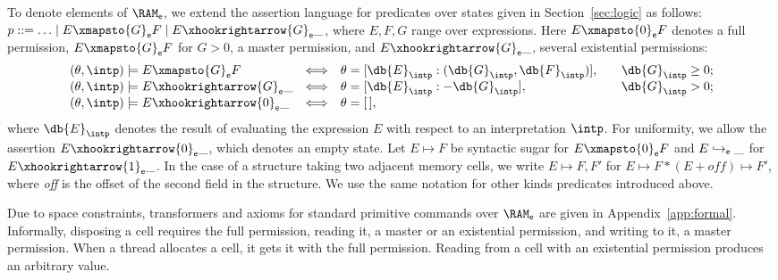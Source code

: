 To denote elements of $\RAM_{\sf e}$, we extend the assertion
language for predicates over states given in Section~\ref{sec:logic} as follows:
$
p ::=  \ldots \mid E \xmapsto{G}_{\sf e} F \mid E \xhookrightarrow{G}_{\sf e} \_
$,
where $E, F, G$ range over expressions.  Here $E \xmapsto{0}_{\sf e} F$ denotes a full
permission, $E \xmapsto{G}_{\sf e} F$ for $G>0$, a master permission, and $E
\xhookrightarrow{G}_{\sf e} \_$, several existential permissions:
$$
\begin{array}{lcl@{\qquad}l}
(\theta, \intp) \models E \xmapsto{G}_{\sf e} F &\Longleftrightarrow &\theta =
[\db{E}_{\intp} : (\db{G}_\intp, \db{F}_{\intp})],&\db{G}_\intp \ge 0;\\
(\theta, \intp) \models E \xhookrightarrow{G}_{\sf e} \_ &\Longleftrightarrow & \theta =
[\db{E}_{\intp} : -\db{G}_\intp],&\db{G}_\intp > 0;\\
(\theta, \intp) \models E \xhookrightarrow{0}_{\sf e} \_ &\Longleftrightarrow
& \theta = [\,],
\end{array}
$$
where $\db{E}_{\intp}$ denotes the result of evaluating the expression
$E$ with respect to an interpretation $\intp$. For uniformity, we allow the
assertion $E \xhookrightarrow{0}_{\sf e} \_$, which denotes an empty state.
Let $E \mapsto F$ be syntactic sugar for $E \xmapsto{0}_{\sf e} F$ and $E
\hookrightarrow_{\sf e} \_$ for $E \xhookrightarrow{1}_{\sf e} \_$.  In the case
of a structure taking two adjacent memory cells, we write $E \mapsto F, F'$ for
$E \mapsto F * (E+\textit{off}) \mapsto F'$, where {\it off} is the offset of
the second field in the structure. We use the same notation for other kinds
predicates introduced above.

Due to space constraints, transformers and axioms for standard primitive
commands over $\RAM_{\sf e}$ are given in Appendix~\ref{app:formal}. Informally,
disposing a cell requires the full permission, reading it, a master or an
existential permission, and writing to it, a master permission. When a thread
allocates a cell, it gets it with the full permission. Reading from a cell with
an existential permission produces an arbitrary value.

